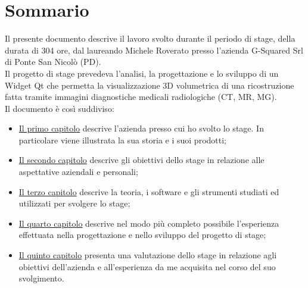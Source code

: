 
\cleardoublepage
{}
{}
\begingroup
\let\clearpage\relax
\let\cleardoublepage\relax
\let\cleardoublepage\relax

\chapter*{Sommario}

Il presente documento descrive il lavoro svolto durante il periodo di stage, della durata di 304 ore, dal laureando Michele Roverato presso l'azienda G-Squared Srl di Ponte San Nicolò (PD).\\
Il progetto di stage prevedeva l'analisi, la progettazione e lo sviluppo di un Widget Qt che permetta la visualizzazione 3D volumetrica di una ricostruzione fatta tramite immagini diagnostiche medicali radiologiche (CT, MR, MG).\\
Il documento è così suddiviso:
\begin{itemize}
    \item \hyperref[cap:introduzione]{Il primo capitolo} descrive l'azienda presso cui ho svolto lo stage. In particolare viene illustrata la sua storia e i suoi prodotti;
    \item \hyperref[cap:descrizione-stage]{Il secondo capitolo} descrive gli obiettivi dello stage in relazione alle aspettative aziendali e personali;
    \item \hyperref[cap:teoria-stage]{Il terzo capitolo} descrive la teoria, i software e gli strumenti studiati ed utilizzati per svolgere lo stage;
    \item \hyperref[cap:resoconto-stage]{Il quarto capitolo} descrive nel modo più completo possibile l’esperienza effettuata nella progettazione e nello sviluppo del progetto di stage;
	\item \hyperref[cap:conclusioni]{Il quinto capitolo} presenta una valutazione dello stage in relazione agli obiettivi dell'azienda e all'esperienza da me acquisita nel corso del suo svolgimento.
\end{itemize}

\endgroup			

\vfill

